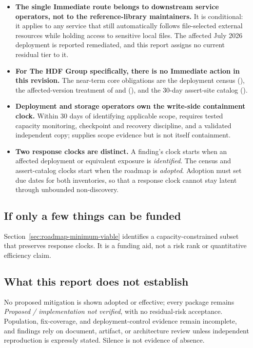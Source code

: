 \documentclass[../main.tex]{subfiles}
\begin{document}
\begin{itemize}
    \item \textbf{The single Immediate route belongs to downstream service
          operators, not to the reference-library maintainers.} It is
          conditional: it applies to any service that still automatically
          follows file-selected external resources while holding access to
          sensitive local files. The affected July 2026 deployment is
          reported remediated, and this report assigns no current residual
          tier to it.
    \item \textbf{For The HDF Group specifically, there is no Immediate
          action in this revision.} The near-term core obligations are the
          deployment census (), the affected-version treatment of
           and  (), and the
          30-day assert-site catalog ().
    \item \textbf{Deployment and storage operators own the write-side
          containment clock.} Within 30 days of identifying applicable scope,
           requires tested capacity monitoring, checkpoint and
          recovery discipline, and a validated independent copy; 
          supplies scope evidence but is not itself containment.
    \item \textbf{Two response clocks are distinct.} A finding's clock starts
          when an affected deployment or equivalent exposure is
          \emph{identified}. The census and assert-catalog clocks start when
          the roadmap is \emph{adopted}. Adoption must set due dates for both
          inventories, so that a response clock cannot stay latent through
          unbounded non-discovery.
\end{itemize}

\subsection*{If only a few things can be funded}

Section~\ref{sec:roadmap-minimum-viable} identifies a capacity-constrained
subset that preserves response clocks. It is a funding aid, not a risk rank or
quantitative efficiency claim.

\subsection*{What this report does not establish}

No proposed mitigation is shown adopted or effective; every package remains
\emph{Proposed / implementation not verified}, with no residual-risk
acceptance. Population, fix-coverage, and deployment-control evidence remain
incomplete, and findings rely on document, artifact, or architecture review
unless independent reproduction is expressly stated. Silence is not evidence
of absence.
\end{document}
